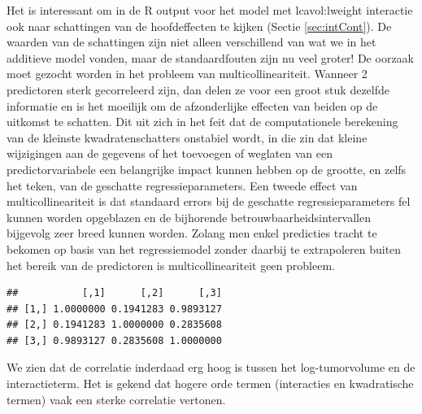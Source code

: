 \documentclass[
  12pt,dutch]{book}
\newenvironment{Shaded}{\begin{snugshade}}{\end{snugshade}}
\newcommand{\FunctionTok}[1]{\textcolor[rgb]{0.13,0.29,0.53}{\textbf{#1}}}
\newcommand{\NormalTok}[1]{#1}
\newcommand{\SpecialCharTok}[1]{\textcolor[rgb]{0.81,0.36,0.00}{\textbf{#1}}}
\theoremstyle{definition}
\theoremstyle{definition}
\theoremstyle{definition}
\theoremstyle{definition}
\theoremstyle{remark}
\begin{document}
Het is interessant om in de R output voor het model met lcavol:lweight interactie ook naar schattingen van de hoofdeffecten te kijken (Sectie \ref{sec:intCont}).
De waarden van de schattingen zijn niet alleen verschillend van wat we in het additieve model vonden, maar de standaardfouten zijn nu veel groter!
De oorzaak moet gezocht worden in het probleem van multicollineariteit.
Wanneer 2 predictoren sterk gecorreleerd zijn, dan delen ze voor een groot stuk dezelfde informatie en is het moeilijk om de afzonderlijke effecten van beiden op de uitkomst te schatten. Dit uit zich in het feit dat de computationele berekening van de kleinste kwadratenschatters onstabiel wordt, in die zin dat kleine wijzigingen aan de gegevens of het toevoegen of weglaten van een predictorvariabele een belangrijke impact kunnen hebben op de grootte, en zelfs het teken, van de geschatte regressieparameters.
Een tweede effect van multicollineariteit is dat standaard errors bij de geschatte regressieparameters fel kunnen worden opgeblazen en de bijhorende betrouwbaarheidsintervallen bijgevolg zeer breed kunnen worden. Zolang men enkel predicties tracht te bekomen op basis van het regressiemodel zonder daarbij te extrapoleren buiten het bereik van de predictoren is multicollineariteit geen probleem.

\begin{Shaded}
\end{Shaded}

\begin{verbatim}
##           [,1]      [,2]      [,3]
## [1,] 1.0000000 0.1941283 0.9893127
## [2,] 0.1941283 1.0000000 0.2835608
## [3,] 0.9893127 0.2835608 1.0000000
\end{verbatim}

We zien dat de correlatie inderdaad erg hoog is tussen het log-tumorvolume en de interactieterm.
Het is gekend dat hogere orde termen (interacties en kwadratische termen) vaak een sterke correlatie vertonen.
\end{document}
